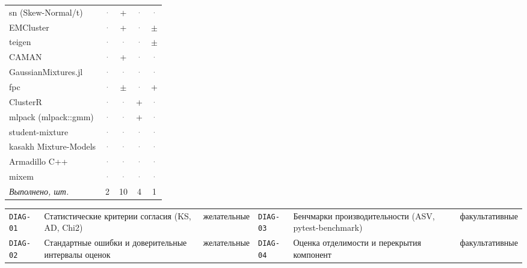 \documentclass[10pt,a4paper]{article}
\begin{document}
\begin{landscape}
{\begin{longtable}{@{}l *{4}{c}@{}}
sn (Skew-Normal/t) & \textcolor{gray}{·} & \cellcolor{yes!35}+ & \textcolor{gray}{·} & \textcolor{gray}{·} \\
EMCluster & \textcolor{gray}{·} & \cellcolor{yes!35}+ & \textcolor{gray}{·} & \cellcolor{part!45}$\pm$ \\
teigen & \textcolor{gray}{·} & \textcolor{gray}{·} & \textcolor{gray}{·} & \cellcolor{part!45}$\pm$ \\
CAMAN & \textcolor{gray}{·} & \cellcolor{yes!35}+ & \textcolor{gray}{·} & \textcolor{gray}{·} \\
GaussianMixtures.jl & \textcolor{gray}{·} & \textcolor{gray}{·} & \textcolor{gray}{·} & \textcolor{gray}{·} \\
fpc & \textcolor{gray}{·} & \cellcolor{part!45}$\pm$ & \textcolor{gray}{·} & \cellcolor{yes!35}+ \\
ClusterR & \textcolor{gray}{·} & \textcolor{gray}{·} & \cellcolor{yes!35}+ & \textcolor{gray}{·} \\
mlpack (mlpack::gmm) & \textcolor{gray}{·} & \textcolor{gray}{·} & \cellcolor{yes!35}+ & \textcolor{gray}{·} \\
student-mixture & \textcolor{gray}{·} & \textcolor{gray}{·} & \textcolor{gray}{·} & \textcolor{gray}{·} \\
kasakh Mixture-Models & \textcolor{gray}{·} & \textcolor{gray}{·} & \textcolor{gray}{·} & \textcolor{gray}{·} \\
Armadillo C++ & \textcolor{gray}{·} & \textcolor{gray}{·} & \textcolor{gray}{·} & \textcolor{gray}{·} \\
mixem & \textcolor{gray}{·} & \textcolor{gray}{·} & \textcolor{gray}{·} & \textcolor{gray}{·} \\
\midrule \textit{Выполнено, шт.} & 2 & 10 & 4 & 1 \\
\bottomrule
\end{longtable}}
{\scriptsize\setlength{\tabcolsep}{3pt}
\begin{tabular}{@{}l >{\raggedright\arraybackslash}p{7.4cm} l l >{\raggedright\arraybackslash}p{7.4cm} l@{}}
\texttt{DIAG-01} & Статистические критерии согласия (KS, AD, Chi2) & желательные & \texttt{DIAG-03} & Бенчмарки производительности (ASV, pytest-benchmark) & факультативные \\
\texttt{DIAG-02} & Стандартные ошибки и доверительные интервалы оценок & желательные & \texttt{DIAG-04} & Оценка отделимости и перекрытия компонент & факультативные \\
\end{tabular}}

\end{landscape}
\end{document}
